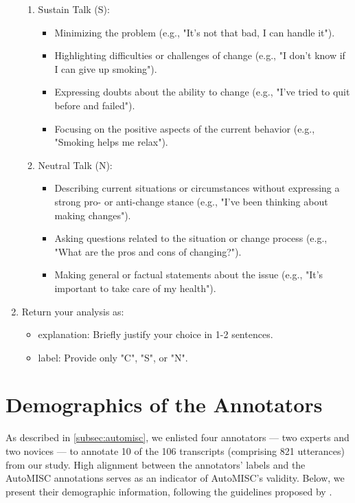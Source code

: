 \begin{tcolorbox}
\begin{enumerate}[itemsep=0pt, parsep=0pt]
\begin{enumerate}[leftmargin=2em]
			      \item Sustain Talk (S):
			            \begin{itemize}[itemsep=0pt, parsep=0pt]
				            \item Minimizing the problem (e.g., "It's not that bad, I can handle it").
				            \item Highlighting difficulties or challenges of change (e.g., "I don't know if I can give up smoking").
				            \item Expressing doubts about the ability to change (e.g., "I've tried to quit before and failed").
				            \item Focusing on the positive aspects of the current behavior (e.g., "Smoking helps me relax").
			            \end{itemize}

			      \item Neutral Talk (N):
			            \begin{itemize}[itemsep=0pt, parsep=0pt]
				            \item Describing current situations or circumstances without expressing a strong pro- or anti-change stance (e.g., "I've been thinking about making changes").
				            \item Asking questions related to the situation or change process (e.g., "What are the pros and cons of changing?").
				            \item Making general or factual statements about the issue (e.g., "It's important to take care of my health").
			            \end{itemize}
		      \end{enumerate}
		\item Return your analysis as:
		      \begin{itemize}
			      \item explanation: Briefly justify your choice in 1-2 sentences.
			      \item label: Provide only "C", "S", or "N".
		      \end{itemize}
	\end{enumerate}

\end{tcolorbox}
\vspace{1em}
\section*{Demographics of the Annotators}

As described in \cref{subsec:automisc}, we enlisted four annotators --- two experts and two novices --- to annotate 10 of the 106 transcripts (comprising 821 utterances) from our study. High alignment between the annotators' labels and the AutoMISC annotations serves as an indicator of AutoMISC's validity. Below, we present their demographic information, following the guidelines proposed by \citet{bender-friedman-2018-data}.


